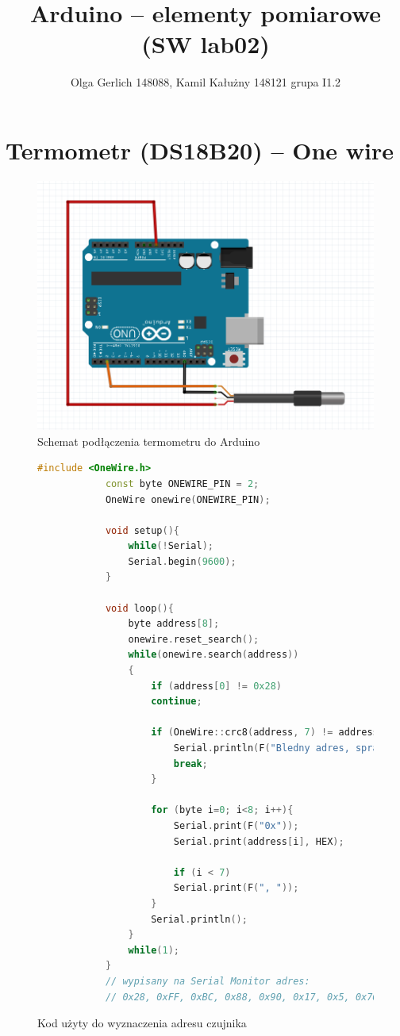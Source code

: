 \documentclass[polish,a4paper]{article}
\title{Arduino – elementy pomiarowe (SW lab02)}
\author{Olga Gerlich 148088, Kamil Kałużny 148121 grupa I1.2}
\begin{document}
	\maketitle
	\section{Termometr (DS18B20) – One wire}
	\begin{figure}[h!]
		\begin{center}
			\includegraphics[scale=0.42]{01_temp_sensor.png}
			\caption*{Schemat podłączenia termometru do Arduino}
		\end{center}
	\end{figure}
	\begin{figure}[h!]
		\begin{lstlisting}[language=C++, basicstyle=\tiny]
			#include <OneWire.h>
			const byte ONEWIRE_PIN = 2;
			OneWire onewire(ONEWIRE_PIN);
			
			void setup(){
				while(!Serial);
				Serial.begin(9600);
			}
			
			void loop(){
				byte address[8];
				onewire.reset_search();
				while(onewire.search(address))
				{
					if (address[0] != 0x28)
					continue;
					
					if (OneWire::crc8(address, 7) != address[7]){
						Serial.println(F("Bledny adres, sprawdz polaczenia"));
						break;
					}
					
					for (byte i=0; i<8; i++){
						Serial.print(F("0x"));
						Serial.print(address[i], HEX);
						
						if (i < 7)
						Serial.print(F(", "));
					}
					Serial.println();
				}
				while(1);
			}
			// wypisany na Serial Monitor adres:
			// 0x28, 0xFF, 0xBC, 0x88, 0x90, 0x17, 0x5, 0x76
		\end{lstlisting}
		\caption*{Kod użyty do wyznaczenia adresu czujnika}
	\end{figure}
	
\end{document}
